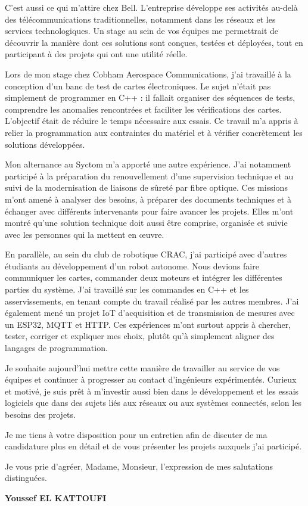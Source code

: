 \documentclass[10pt,a4paper]{article}
\begin{document}
C'est aussi ce qui m'attire chez Bell. L'entreprise développe ses activités au-delà des télécommunications traditionnelles, notamment dans les réseaux et les services technologiques. Un stage au sein de vos équipes me permettrait de découvrir la manière dont ces solutions sont conçues, testées et déployées, tout en participant à des projets qui ont une utilité réelle.

Lors de mon stage chez Cobham Aerospace Communications, j'ai travaillé à la conception d'un banc de test de cartes électroniques. Le sujet n'était pas simplement de programmer en C++ : il fallait organiser des séquences de tests, comprendre les anomalies rencontrées et faciliter les vérifications des cartes. L'objectif était de réduire le temps nécessaire aux essais. Ce travail m'a appris à relier la programmation aux contraintes du matériel et à vérifier concrètement les solutions développées.

Mon alternance au Syctom m'a apporté une autre expérience. J'ai notamment participé à la préparation du renouvellement d'une supervision technique et au suivi de la modernisation de liaisons de sûreté par fibre optique. Ces missions m'ont amené à analyser des besoins, à préparer des documents techniques et à échanger avec différents intervenants pour faire avancer les projets. Elles m'ont montré qu'une solution technique doit aussi être comprise, organisée et suivie avec les personnes qui la mettent en œuvre.

En parallèle, au sein du club de robotique CRAC, j'ai participé avec d'autres étudiants au développement d'un robot autonome. Nous devions faire communiquer les cartes, commander deux moteurs et intégrer les différentes parties du système. J'ai travaillé sur les commandes en C++ et les asservissements, en tenant compte du travail réalisé par les autres membres. J'ai également mené un projet IoT d'acquisition et de transmission de mesures avec un ESP32, MQTT et HTTP. Ces expériences m'ont surtout appris à chercher, tester, corriger et expliquer mes choix, plutôt qu'à simplement aligner des langages de programmation.

Je souhaite aujourd'hui mettre cette manière de travailler au service de vos équipes et continuer à progresser au contact d'ingénieurs expérimentés. Curieux et motivé, je suis prêt à m'investir aussi bien dans le développement et les essais logiciels que dans des sujets liés aux réseaux ou aux systèmes connectés, selon les besoins des projets.

Je me tiens à votre disposition pour un entretien afin de discuter de ma candidature plus en détail et de vous présenter les projets auxquels j'ai participé.

Je vous prie d'agréer, Madame, Monsieur, l'expression de mes salutations distinguées.

\vspace{2pt}
{\raggedleft\bfseries\color{bleu}Youssef EL KATTOUFI\par}
\end{document}
